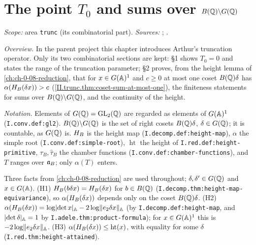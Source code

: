 
\chapter{\texorpdfstring{The point $T_0$ and sums over $B(\mathbb{Q})\backslash G(\mathbb{Q})$}{The point T0 and sums over B(Q)\textbackslash G(Q)}}\label{ch:ch-06-truncation}

\noindent\emph{Scope:} area \texttt{trunc} (its combinatorial part). \emph{Sources:} \cite[§§5, 6, 9]{AIntro}; \cite[Lecture III §2]{Gel}.

\noindent\emph{Overview.} In the parent project this chapter introduces Arthur's truncation operator. Only its two combinatorial sections are
kept: §1 shows $T_0=0$ and states the range of the truncation parameter; §2 proves, from the height lemma of \cref{ch:ch-0-08-reduction}, that for
$x\in G(\mathbb{A})^1$ and $c\ge0$ at most one coset $B(\mathbb{Q})\delta$ has $\alpha(H_B(\delta x))>c$ (\cref{II.trunc.thm:coset-sum-at-most-one}), the
finiteness statements for sums over $B(\mathbb{Q})\backslash G(\mathbb{Q})$, and the continuity of the height.

\noindent\emph{Notation.} Elements of $G(\mathbb{Q})=\mathrm{GL}_2(\mathbb{Q})$ are regarded as elements of $G(\mathbb{A})^1$ (\texttt{I.conv.def:gl2}). $B(\mathbb{Q})\backslash G(\mathbb{Q})$ is the set of right cosets
$B(\mathbb{Q})\delta$, $\delta\in G(\mathbb{Q})$; it is countable, as $G(\mathbb{Q})$ is. $H_B$ is the height map (\texttt{I.decomp.def:height-map}), $\alpha$ the simple root
(\texttt{I.conv.def:simple-root}), $\operatorname{ht}$ the height of \texttt{I.red.def:height-primitive}, $\tau_B,\hat\tau_B$ the chamber functions
(\texttt{I.conv.def:chamber-functions}), and $T$ ranges over $\mathfrak{a}_B$; only $\alpha(T)$ enters.

Three facts from \cref{ch:ch-0-08-reduction} are used throughout; $\delta,\delta'\in G(\mathbb{Q})$ and $x\in G(\mathbb{A})$.
(H1) $H_B(b\delta x)=H_B(\delta x)$ for $b\in B(\mathbb{Q})$ (\texttt{I.decomp.thm:height-map-equivariance}), so $\alpha(H_B(\delta x))$ depends only on
the coset $B(\mathbb{Q})\delta$.
(H2) $\alpha(H_B(\delta x))=\log\lvert\det x\rvert_{\mathbb{A}}-2\log\lVert e_2\delta x\rVert_{\mathbb{A}}$ (by \texttt{I.decomp.def:height-map}, and $\lvert\det\delta\rvert_{\mathbb{A}}=1$ by
\texttt{I.adele.thm:product-formula}); for $x\in G(\mathbb{A})^1$ this is $-2\log\lVert e_2\delta x\rVert_{\mathbb{A}}$.
(H3) $\alpha(H_B(\delta x))\le\operatorname{ht}(x)$, with equality for some $\delta$ (\texttt{I.red.thm:height-attained}).

